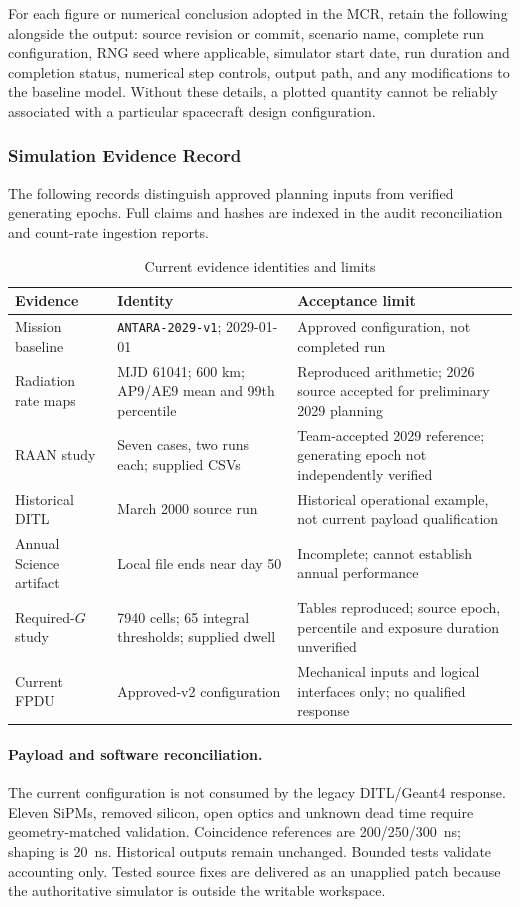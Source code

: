 For each figure or numerical conclusion adopted in the MCR, retain the following alongside the output: source revision or commit, scenario name, complete run configuration, RNG seed where applicable, simulator start date, run duration and completion status, numerical step controls, output path, and any modifications to the baseline model. Without these details, a plotted quantity cannot be reliably associated with a particular spacecraft design configuration.

\subsubsection{Simulation Evidence Record}
\label{app:evidence-record}
The following records distinguish approved planning inputs from verified generating epochs. Full claims and hashes are indexed in the audit reconciliation and count-rate ingestion reports.
\begin{table}[H]\centering\small
\caption{Current evidence identities and limits}\label{tab:evidence-record-template}
\begin{tabularx}{\linewidth}{@{}p{3cm}p{4cm}X@{}}\toprule
Evidence & Identity & Acceptance limit\\\midrule
Mission baseline & \texttt{ANTARA-2029-v1}; 2029-01-01 & Approved configuration, not completed run\\
Radiation rate maps & MJD 61041; 600 km; AP9/AE9 mean and 99th percentile & Reproduced arithmetic; 2026 source accepted for preliminary 2029 planning\\
RAAN study & Seven cases, two runs each; supplied CSVs & Team-accepted 2029 reference; generating epoch not independently verified\\
Historical DITL & March 2000 source run & Historical operational example, not current payload qualification\\
Annual Science artifact & Local file ends near day 50 & Incomplete; cannot establish annual performance\\
Required-$G$ study & 7940 cells; 65 integral thresholds; supplied dwell & Tables reproduced; source epoch, percentile and exposure duration unverified\\
Current FPDU & Approved-v2 configuration & Mechanical inputs and logical interfaces only; no qualified response\\\bottomrule
\end{tabularx}\end{table}

\paragraph{Payload and software reconciliation.}
The current configuration is not consumed by the legacy DITL/Geant4 response. Eleven SiPMs, removed silicon, open optics and unknown dead time require geometry-matched validation. Coincidence references are 200/250/300~ns; shaping is 20~ns. Historical outputs remain unchanged. Bounded tests validate accounting only. Tested source fixes are delivered as an unapplied patch because the authoritative simulator is outside the writable workspace.

